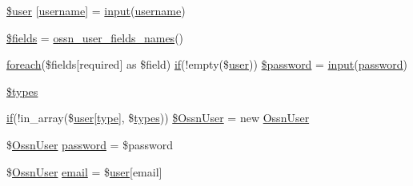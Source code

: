 \begin{DoxyCompactItemize}
\item 
\hyperlink{actions_2administrator_2user_2edit_8php_a48c184d1487bdbc0b0d2fe6e1521dd7d}{\$user} \mbox{[}\textquotesingle{}\hyperlink{actions_2account_8php_ac9b3768ccc688c2ff0811c50c107a02e}{username}\textquotesingle{}\mbox{]} = \hyperlink{ossn_8lib_8input_8php_a64ebee98b041c4f75f71ed3cd73cc8ed}{input}(\textquotesingle{}\hyperlink{actions_2account_8php_ac9b3768ccc688c2ff0811c50c107a02e}{username}\textquotesingle{})
\item 
\hyperlink{actions_2administrator_2user_2edit_8php_ab2303c817e3b402b77b7f99627b9c319}{\$fields} = \hyperlink{ossn_8lib_8users_8php_a67125cfdd672959bff2d8dbd44034cb0}{ossn\+\_\+user\+\_\+fields\+\_\+names}()
\item 
\hyperlink{user__timeline_8php_a1b18c909b5f0affc85267f294d947c4b}{foreach}(\$fields\mbox{[}\textquotesingle{}required\textquotesingle{}\mbox{]} as \$field) \hyperlink{jquery_8tokeninput_8js_ad8dd46a3cbc004569e34401e9e71771a}{if}(!empty(\$\hyperlink{ossn_8config_8db_8example_8php_a802544b7ba9f79bbf24ef67773d53bed}{user})) \hyperlink{actions_2administrator_2user_2edit_8php_a648b3a8140c75f1ff49bada92af0d8cd}{\$password} = \hyperlink{ossn_8lib_8input_8php_a64ebee98b041c4f75f71ed3cd73cc8ed}{input}(\textquotesingle{}\hyperlink{actions_2account_8php_a3ef39d3ee8b2bcca6a288308549ccb44}{password}\textquotesingle{})
\item 
\hyperlink{actions_2administrator_2user_2edit_8php_a92d70a97331cc6fc0a79d9da50895be8}{\$types}
\item 
\hyperlink{jquery_8tokeninput_8js_ad8dd46a3cbc004569e34401e9e71771a}{if}(!in\+\_\+array(\$\hyperlink{ossn_8config_8db_8example_8php_a802544b7ba9f79bbf24ef67773d53bed}{user}\mbox{[}\textquotesingle{}\hyperlink{_ossn_wall_2actions_2wall_2post_2group_8php_a2dc1bb4e1ed0029daa81ac0776b14b51}{type}\textquotesingle{}\mbox{]}, \$\hyperlink{_chart_8_core_8js_a0ecd014dd4c5d61d8130961daf1eed54}{types})) \hyperlink{actions_2administrator_2user_2edit_8php_a737f7f6b93addd37d85f4ed89e4de785}{\$\+Ossn\+User} = new \hyperlink{class_ossn_user}{Ossn\+User}
\item 
\$\hyperlink{class_ossn_user}{Ossn\+User} \hyperlink{actions_2administrator_2user_2edit_8php_abec14e65dc912d61d2d443eb3533cd9f}{password} = \$password
\item 
\$\hyperlink{class_ossn_user}{Ossn\+User} \hyperlink{actions_2administrator_2user_2edit_8php_a029df90d1a93ec9889cd9e166863617c}{email} = \$\hyperlink{ossn_8config_8db_8example_8php_a802544b7ba9f79bbf24ef67773d53bed}{user}\mbox{[}\textquotesingle{}email\textquotesingle{}\mbox{]}

\end{DoxyCompactItemize}
